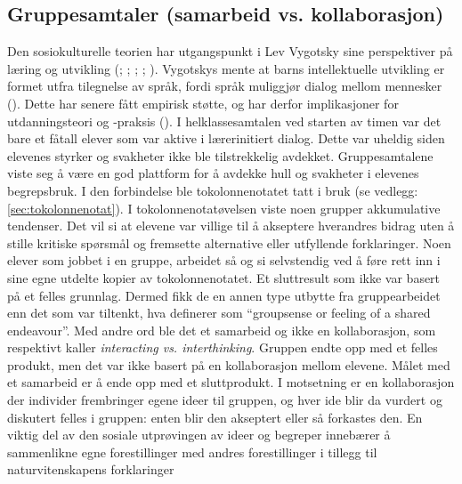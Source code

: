\documentclass[main.tex]{subfiles}
\begin{document}
\subsection*{Gruppesamtaler (samarbeid vs. kollaborasjon)}
Den sosiokulturelle teorien har utgangspunkt i Lev Vygotsky sine perspektiver på læring og 
utvikling (; ; ; 
; ). Vygotskys 
mente at barns intellektuelle utvikling er formet utfra tilegnelse av språk, fordi språk 
muliggjør dialog mellom mennesker (). Dette har senere fått empirisk
støtte, og har derfor implikasjoner for utdanningsteori og -praksis ().
\newline
\newline
I helklassesamtalen ved starten av timen var det bare et fåtall elever som var aktive i lærerinitiert 
dialog. Dette var uheldig siden elevenes styrker og svakheter ikke ble tilstrekkelig avdekket. 
Gruppesamtalene viste seg å være en god plattform for å avdekke hull og svakheter i elevenes 
begrepsbruk. I den forbindelse ble tokolonnenotatet tatt i bruk (se vedlegg: \ref{sec:tokolonnenotat}).
\newline
\newline
I tokolonnenotatøvelsen viste noen grupper akkumulative tendenser. Det vil si at elevene 
var villige til å akseptere hverandres bidrag uten å stille kritiske spørsmål og fremsette
alternative eller utfyllende forklaringer. Noen elever som jobbet i en gruppe, arbeidet så og si
selvstendig ved å føre rett inn i sine egne utdelte kopier av tokolonnenotatet. Et sluttresult som 
ikke var basert på et felles grunnlag. Dermed fikk de en annen type utbytte fra gruppearbeidet
enn det som var tiltenkt, hva   definerer som ``groupsense or feeling of a shared endeavour''. 
Med andre ord ble det et samarbeid og ikke en kollaborasjon, som  respektivt kaller 
\emph{interacting vs. interthinking}. Gruppen endte opp med et felles produkt, men det var ikke 
basert på en kollaborasjon mellom elevene. Målet med et samarbeid er å ende opp med et sluttprodukt. 
I motsetning er en kollaborasjon der individer frembringer egene ideer til gruppen, og hver ide
blir da vurdert og diskutert felles i gruppen: enten blir den akseptert eller så forkastes den.
\newline
\newline
En viktig del av den sosiale utprøvingen av ideer og begreper innebærer å sammenlikne egne 
forestillinger med andres forestillinger i tillegg til naturvitenskapens forklaringer 
\end{document}
